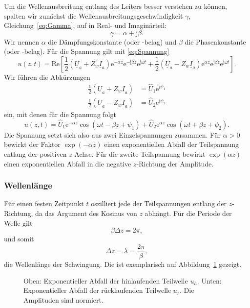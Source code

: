 \documentclass[paper=a4, parskip=half-, ngerman, fontsize=11pt]{scrreprt}
\begin{document}
Um die Wellenausbreitung entlang des Leiters besser verstehen zu können, spalten wir zunächst die
Wellenausbreitungsgeschwindigkeit $\gamma$, Gleichung~\eqref{eq:Gamma}, auf in Real- und Imaginärteil:
\[ \gamma = \alpha + \mathrm{j} \beta. \] Wir nennen $\alpha$ die Dämpfungskonstante (oder -belag) und $\beta$ die
Phasenkonstante (oder -belag). Für die Spannung gilt mit \eqref{eq:Spannung}
\begin{equation*}
u(z, t) = \mathrm{Re} \left[
\frac{1}{2} \left( \underline{U}_{a} + Z_{w} \underline{I}_{a} \right) \mathrm{e}^{- \alpha z}
\mathrm{e}^{- \mathrm{j} \beta z} \mathrm{e}^{\mathrm{j} \omega t}
+
\frac{1}{2} \left( \underline{U}_{a} - Z_{w} \underline{I}_{a} \right) \mathrm{e}^{\alpha z}
\mathrm{e}^{\mathrm{j} \beta z} \mathrm{e}^{\mathrm{j} \omega t}
\right].
\end{equation*}
Wir führen die Abkürzungen
\begin{align*}
\frac{1}{2} \left( \underline{U}_{a} + Z_{w} \underline{I}_{a} \right) &= \hat{U}_{1} \mathrm{e}^{\mathrm{j} \psi_{1}}
\\[1ex]
\frac{1}{2} \left( \underline{U}_{a} - Z_{w} \underline{I}_{a} \right) &= \hat{U}_{2} \mathrm{e}^{\mathrm{j} \psi_{2}}
\end{align*}
ein, mit denen für die Spannung folgt
\begin{equation*}
u(z,t) =
\hat{U}_{1} \mathrm{e}^{- \alpha z} \cos \left( \omega t - \beta z + \psi_{1} \right)
+
\hat{U}_{2} \mathrm{e}^{\alpha z} \cos \left( \omega t + \beta z + \psi_{2} \right).
\end{equation*}
Die Spannung setzt sich also aus zwei Einzelspannungen zusammen. Für $\alpha > 0$ bewirkt der Faktor $\exp(-\alpha z)$
einen exponentiellen Abfall der Teilspannung entlang der positiven $z$-Achse. Für die zweite Teilspannung bewirkt
$\exp(\alpha z)$ einen exponentiellen Abfall in die negative $z$-Richtung der Amplitude.

\subsubsection{Wellenlänge}

Für einen festen Zeitpunkt $t$ oszilliert jede der Teilspannungen entlang der $z$-Richtung, da das Argument des Kosinus
von $z$ abhängt. Für die Periode der Welle gilt \[ \beta \Delta z = 2 \pi, \] und somit
\[ \Delta z = \lambda = \frac{2 \pi}{\beta}, \] die Wellenlänge der Schwingung. Die ist exemplarisch auf
Abbildung~\ref{ExpWelle} gezeigt.
\begin{figure}[!htb]
    \begin{center}
        
        \caption{Oben: Exponentieller Abfall der hinlaufenden Teilwelle $u_{h}$. Unten: Exponentieller Abfall der
        rücklaufenden Teilwelle $u_{r}$. Die Amplituden sind normiert.}
        \label{ExpWelle}
    \end{center}
\end{figure}
\end{document}
